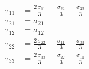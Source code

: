 \begin{align}
\tau_{11} &= \frac{2\,\sigma _{11}}{3}-\frac{\sigma _{22}}{3}-\frac{\sigma _{33}}{3} \\ 
\tau_{21} &= \sigma _{21} \\ 
\tau_{12} &= \sigma _{12} \\ 
\tau_{22} &= \frac{2\,\sigma _{22}}{3}-\frac{\sigma _{11}}{3}-\frac{\sigma _{33}}{3} \\ 
\tau_{33} &= \frac{2\,\sigma _{33}}{3}-\frac{\sigma _{22}}{3}-\frac{\sigma _{11}}{3} 
\end{align}
